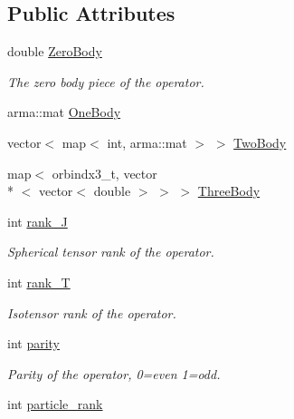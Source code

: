\subsection*{Public Attributes}
\begin{DoxyCompactItemize}
\item 
\hypertarget{classOperator_a2f9f1109333a2485083cc7c090f9cd26}{double \hyperlink{classOperator_a2f9f1109333a2485083cc7c090f9cd26}{Zero\-Body}}\label{classOperator_a2f9f1109333a2485083cc7c090f9cd26}

\begin{DoxyCompactList}\small\item\em The zero body piece of the operator. \end{DoxyCompactList}\item 
arma\-::mat \hyperlink{classOperator_a14b1c78e0be45772aa57168c74d1b57c}{One\-Body}
\item 
vector$<$ map$<$ int, arma\-::mat $>$ $>$ \hyperlink{classOperator_a0778ed6b9b7b47e34f11fa187189c943}{Two\-Body}
\item 
map$<$ orbindx3\-\_\-t, vector\\*
$<$ vector$<$ double $>$ $>$ $>$ \hyperlink{classOperator_a74ea65bd21f8bd5aa8e67782a700c377}{Three\-Body}
\item 
\hypertarget{classOperator_a71a7c194800e2758c42ad0d5f30299aa}{int \hyperlink{classOperator_a71a7c194800e2758c42ad0d5f30299aa}{rank\-\_\-\-J}}\label{classOperator_a71a7c194800e2758c42ad0d5f30299aa}

\begin{DoxyCompactList}\small\item\em Spherical tensor rank of the operator. \end{DoxyCompactList}\item 
\hypertarget{classOperator_ac70ee8dbbc4cb4f61972575c68bb9a51}{int \hyperlink{classOperator_ac70ee8dbbc4cb4f61972575c68bb9a51}{rank\-\_\-\-T}}\label{classOperator_ac70ee8dbbc4cb4f61972575c68bb9a51}

\begin{DoxyCompactList}\small\item\em Isotensor rank of the operator. \end{DoxyCompactList}\item 
\hypertarget{classOperator_ad628e91e2dd2542c0f34e985271adcd3}{int \hyperlink{classOperator_ad628e91e2dd2542c0f34e985271adcd3}{parity}}\label{classOperator_ad628e91e2dd2542c0f34e985271adcd3}

\begin{DoxyCompactList}\small\item\em Parity of the operator, 0=even 1=odd. \end{DoxyCompactList}\item 
\hypertarget{classOperator_a44a74c03caff49e776433e885a724956}{int \hyperlink{classOperator_a44a74c03caff49e776433e885a724956}{particle\-\_\-rank}}\label{classOperator_a44a74c03caff49e776433e885a724956}


\end{DoxyCompactItemize}
